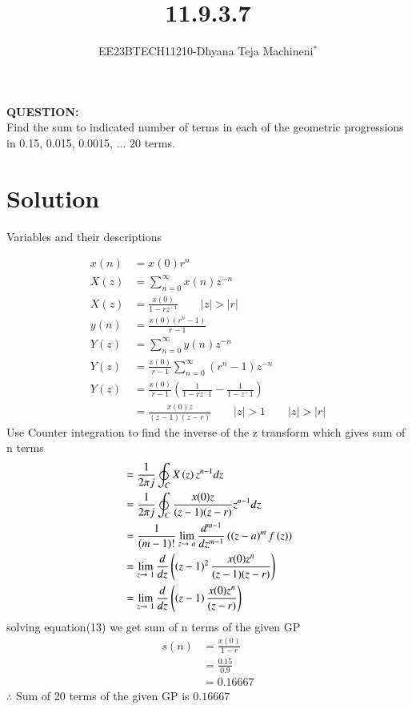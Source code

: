 \documentclass[journal,12pt,twocolumn]{IEEEtran}
\theoremstyle{remark}
\begin{document}

\vspace{3cm}
\title{\textbf{11.9.3.7}}
\author{EE23BTECH11210-Dhyana Teja Machineni$^{*}$%
}
\maketitle
\newpage
\bigskip

\textbf{QUESTION:}\\
Find the sum to indicated number of terms in each of the geometric progressions in
0.15, 0.015, 0.0015, ... 20 terms.
\section*{Solution}
 
\begin{flushleft}
     \begin{table}[h]
         \caption{Variables and their descriptions}
         \label{tab:table2}
         
     \end{table}
 \end{flushleft}
\begin{align}
x(n) &= x(0)r^n \\
X(z)&= \sum_{n=0}^{\infty}x(n) z^{-n}\\
X(z) &= \frac{x(0)}{1-rz^{-1}} \qquad |z| > |r| \\
y(n)&= \frac{x(0)(r^n-1)}{r-1}\\
Y(z)&= \sum_{n=0}^{\infty} y(n) z^{-n}\\
Y(z)&= \frac{x(0)}{r-1}\sum_{n=0}^{\infty} (r^{n}-1) z^{-n}\\
Y(z)&=\frac{x(0)}{r-1} \left( \frac{1}{1-rz^-1}-\frac{1}{1-z^-1} \right)\\
&=\frac{x(0) z}{(z-1)(z-r)}\qquad |z| > 1  \qquad |z|>|r|
\end{align}
Use Counter integration to find the inverse of the z transform which gives sum of n terms
\begin{align}
&= \frac{1}{2\pi j}\oint_C X\brak{z}z^{n-1}dz\\
&=\frac{1}{2\pi j}\oint_C \frac{x(0) z}{(z-1)(z-r)}z^{n-1} dz\\
&= \frac{1}{\brak{m-1}!}\lim_{z\to\ a}\frac{d^{m-1}}{dz^{m-1}}\brak{\brak{z-a}^m f\brak{z}}\\
 &= \lim_{z\to \ 1}\frac{d}{dz}\brak{\brak{z-1}^2 \frac{x(0) z^n}{(z-1)(z-r)}}\\
 &=\lim_{z\to \ 1}\frac{d}{dz}\brak{\brak{z-1} \frac{x(0) z^n}{(z-r)}}
\end{align}
\hspace{0.5cm}    solving equation(13) we get sum of n terms of the given GP
\begin{align}
    s(n)&= \frac{x(0)}{1-r}\\
    &=\frac{0.15}{0.9}\\
    &=0.16667
\end{align}
        $\therefore$ Sum of 20 terms of the given GP is $0.16667$
       \renewcommand{\thefigure}{\theenumi}
 \renewcommand{\thetable}{\theenumi}
\end{document}
